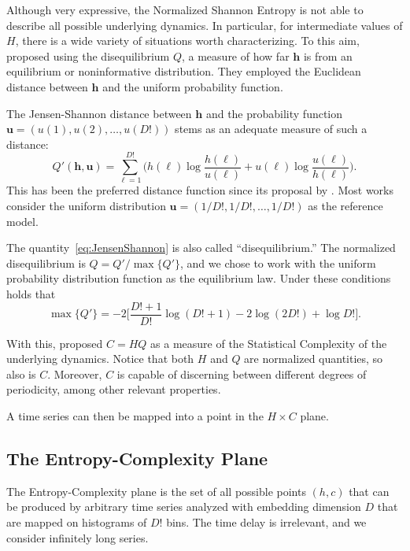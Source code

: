 \documentclass[alpha-refs]{wiley-article}
\begin{document}
Although very expressive, the Normalized Shannon Entropy is not able to describe all possible underlying dynamics.
In particular, for intermediate values of $H$, there is a wide variety of situations worth characterizing.
To this aim, \citet{LopezRuiz1995} proposed using the disequilibrium  $Q$, a measure of how far $\bm h$ is from an equilibrium or noninformative distribution.
They employed the Euclidean distance between $\bm h$ and the uniform probability function.

The Jensen-Shannon distance between $\bm h$ and the probability function $\bm u=(u(1), u(2), \dots, u(D!))$ stems as an adequate measure of such a distance:
\begin{equation}
Q'(\bm{h}, \bm{u}) = \sum_{\ell=1}^{D!} \Big(h(\ell) \log\frac{h(\ell)}{u(\ell)} +
u(\ell) \log\frac{u(\ell)}{h(\ell)}
\Big).
\label{eq:JensenShannon}
\end{equation}
This has been the preferred distance function since its proposal by \citet{Lamberti2004}.
Most works consider the uniform distribution $\bm u = (1/D!, 1/D!, \dots, 1/D!)$ as the reference model.

The quantity~\eqref{eq:JensenShannon} is also called ``disequilibrium.''
The normalized disequilibrium is $ Q=Q'/\max\{Q'\}$, and we chose to work with the uniform probability distribution function as the equilibrium law.
Under these conditions holds that
$$
\max\{Q'\} = -2\Big[
\frac{D!+1}{D!} \log(D!+1) - 2 \log(2D!) + \log D!
\Big].
$$

With this, \citet{Lamberti2004} proposed $C=HQ$ as a measure of the Statistical Complexity of the underlying dynamics.
Notice that both $H$ and $Q$ are normalized quantities, so also is $C$. 
Moreover, $C$ is capable of discerning between different degrees of periodicity, among other relevant properties.

A time series can then be mapped into a point in the $H\times C$ plane.

\subsection{The Entropy-Complexity Plane}\label{Sec:HCPlane}

The Entropy-Complexity plane is the set of all possible points $(h,c)$ that can be produced by arbitrary time series analyzed with embedding dimension $D$ that are mapped on histograms of $D!$ bins.
The time delay is irrelevant, and we consider infinitely long series.
\end{document}
